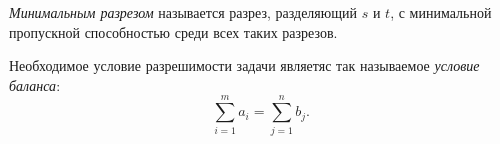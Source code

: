 \begin{definition}
	\emph{Минимальным разрезом} называется разрез, разделяющий $s$ и $t$, с минимальной пропускной способностью среди всех таких разрезов.
\end{definition}

\begin{definition}
	Необходимое условие разрешимости задачи являетяс так называемое \emph{условие баланса}:
	\[
		\sum_{i=1}^{m} a_i = \sum_{j=1}^{n} b_j.
	\]
\end{definition}
